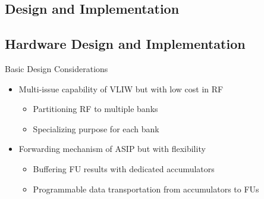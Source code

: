 \documentclass{beamer}
\begin{document}
\begin{CJK}{UTF8}{bkai}


            \section{Design and Implementation}

            \subsection{Hardware Design and Implementation}
            \begin{frame}{Basic Design Considerations}
                \begin{itemize}
                    \item Multi-issue capability of VLIW but with low cost in RF
                        \begin{itemize}
                            \item Partitioning RF to multiple banks
                            \item Specializing purpose for each bank
                        \end{itemize}
                    \item Forwarding mechanism of ASIP but with flexibility
                        \begin{itemize}
                            \item Buffering FU results with dedicated accumulators
                            \item Programmable data transportation from accumulators to FUs
                        \end{itemize}
                \end{itemize}
            \end{frame}


\end{CJK}
\end{document}
